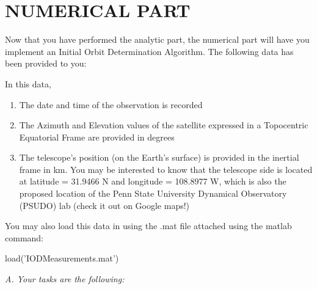 \documentclass[12pt, letterpaper]{aiaa-tc}
\begin{document}
\section{NUMERICAL PART}
Now that you have performed the analytic part, the numerical part will have you implement an Initial Orbit
Determination Algorithm. The following data has been provided to you:

In this data,
\begin{enumerate}
    \item The date and time of the observation is recorded
    \item The Azimuth and Elevation values of the satellite expressed in a Topocentric Equatorial Frame are provided
    in degrees
    \item The telescope's position (on the Earth's surface) is provided in the inertial frame in km. You may be interested
    to know that the telescope side is located at latitude = 31.9466 N and longitude = 108.8977 W, which is
    also the proposed location of the Penn State University Dynamical Observatory (PSUDO) lab (check it out
    on Google maps!)
\end{enumerate}
You may also load this data in using the .mat file attached using the matlab command:

\quad load('IODMeasurements.mat')

\raggedright \textit{A. Your tasks are the following:}
\end{document}
